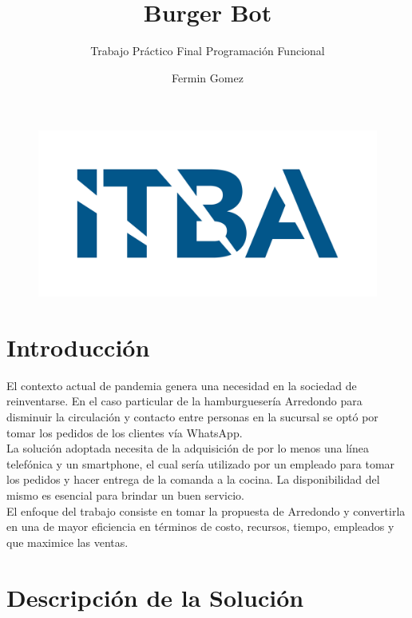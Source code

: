 \documentclass[a4paper,12pt]{article}
\title{Burger Bot}
\subtitle{Trabajo Práctico Final Programación Funcional}
\author{Fermin Gomez}
\begin{document}
\maketitle

\begin{figure}[H]
	\centering
	\includegraphics[width=0.7\linewidth]{itba}
\end{figure}

\pagebreak

\tableofcontents

\pagebreak

\section{Introducción}

El contexto actual de pandemia genera una necesidad en la sociedad de reinventarse. En el caso particular de la hamburguesería Arredondo para disminuir la circulación y contacto entre personas en la sucursal se optó por tomar los pedidos de los clientes vía WhatsApp. 
\\
La solución adoptada necesita de la adquisición de por lo menos una línea  telefónica y un smartphone, el cual sería utilizado por un empleado para tomar los pedidos y hacer entrega de la comanda a la cocina. La disponibilidad del mismo es esencial para brindar un buen servicio. 
\\
El enfoque del trabajo consiste en tomar la propuesta de Arredondo y convertirla en una de mayor eficiencia en términos de costo, recursos, tiempo, empleados y que maximice las ventas.  

\section{Descripción de la Solución}
\end{document}
